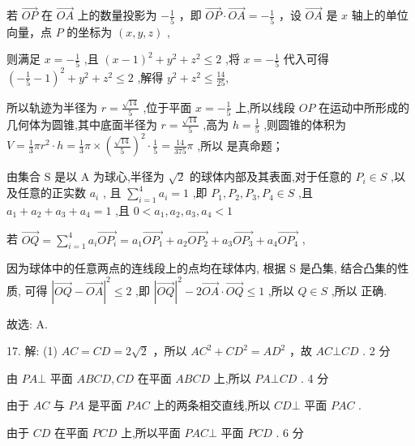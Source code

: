 \documentclass[10pt]{article}
\newcommand*\circled[1]{\tikz[baseline=(char.base)]{\node[shape=circle,draw,inner sep=1.5pt] (char) {\small #1};}}
\begin{document}
 \circled{1} 若 \(\overrightarrow{OP}\) 在 \(\overrightarrow{OA}\) 上的数量投影为 \(- \frac{1}{5}\) ，即 \(\overrightarrow{OP} \cdot  \overrightarrow{OA} =  - \frac{1}{5}\) ，设 \(\overrightarrow{OA}\) 是 \(x\) 轴上的单位向量，点 \(P\) 的坐标为 \(\left( {x,y,z}\right)\) ,

则满足 \(x =  - \frac{1}{5}\) ,且 \({\left( x - 1\right) }^{2} + {y}^{2} + {z}^{2} \leq  2\) ,将 \(x =  - \frac{1}{5}\) 代入可得 \({\left( -\frac{1}{5} - 1\right) }^{2} + {y}^{2} + {z}^{2} \leq  2\) ,解得 \({y}^{2} + {z}^{2} \leq  \frac{14}{25},\)

所以轨迹为半径为 \(r = \frac{\sqrt{14}}{5}\) ,位于平面 \(x =  - \frac{1}{5}\) 上,所以线段 \({OP}\) 在运动中所形成的几何体为圆锥,其中底面半径为 \(r = \frac{\sqrt{14}}{5}\) ,高为 \(h = \frac{1}{5}\) ,则圆锥的体积为 \(V = \frac{1}{3}\pi {r}^{2} \cdot  h = \frac{1}{3}\pi  \times  {\left( \frac{\sqrt{14}}{5}\right) }^{2} \cdot  \frac{1}{5} = \frac{14}{375}\pi\) ,所以  \circled{1} 是真命题；

由集合 \(\mathrm{S}\) 是以 \(\mathrm{A}\) 为球心,半径为 \(\sqrt{2}\) 的球体内部及其表面,对于任意的 \({P}_{i} \in  S\) ,以及任意的正实数 \({a}_{i}\) , 且 \(\mathop{\sum }\limits_{{i = 1}}^{4}{a}_{i} = 1\) ,即 \({P}_{1},{P}_{2},{P}_{3},{P}_{4} \in  S\) ,且 \({a}_{1} + {a}_{2} + {a}_{3} + {a}_{4} = 1\) ,且 \(0 < {a}_{1},{a}_{2},{a}_{3},{a}_{4} < 1\)

若 \(\overrightarrow{OQ} = \mathop{\sum }\limits_{{i = 1}}^{4}{a}_{i}\overrightarrow{O{P}_{i}} = {a}_{1}\overrightarrow{O{P}_{1}} + {a}_{2}\overrightarrow{O{P}_{2}} + {a}_{3}\overrightarrow{O{P}_{3}} + {a}_{4}\overrightarrow{O{P}_{4}}\) ,

因为球体中的任意两点的连线段上的点均在球体内, 根据 S 是凸集, 结合凸集的性质, 可得 \({\left| \overrightarrow{OQ} - \overrightarrow{OA}\right| }^{2} \leq  2\) ,即 \({\left| \overrightarrow{OQ}\right| }^{2} - 2\overrightarrow{OA} \cdot  \overrightarrow{OQ} \leq  1\) ,所以 \(Q \in  S\) ,所以 \circled{2} 正确.

故选: A.

17. 解: (1) \({AC} = {CD} = 2\sqrt{2}\) ，所以 \(A{C}^{2} + C{D}^{2} = A{D}^{2}\) ，故 \({AC}\bot {CD}\) . 2 分

由 \({PA} \bot\) 平面 \({ABCD},{CD}\) 在平面 \({ABCD}\) 上,所以 \({PA} \bot  {CD}\) . 4 分

由于 \({AC}\) 与 \({PA}\) 是平面 \({PAC}\) 上的两条相交直线,所以 \({CD} \bot\) 平面 \({PAC}\) .

由于 \({CD}\) 在平面 \({PCD}\) 上,所以平面 \({PAC} \bot\) 平面 \({PCD}\) . 6 分
\end{document}
